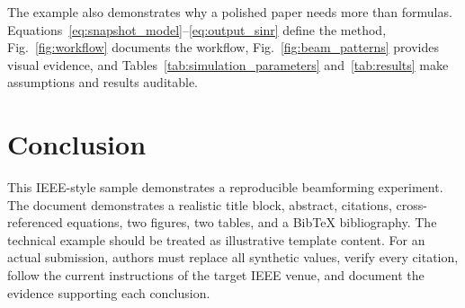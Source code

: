 \documentclass[conference]{IEEEtran}
\begin{document}
The example also demonstrates why a polished paper needs more than formulas. Equations~\eqref{eq:snapshot_model}--\eqref{eq:output_sinr} define the method, Fig.~\ref{fig:workflow} documents the workflow, Fig.~\ref{fig:beam_patterns} provides visual evidence, and Tables~\ref{tab:simulation_parameters} and~\ref{tab:results} make assumptions and results auditable.

\section{Conclusion}
This IEEE-style sample demonstrates a reproducible beamforming experiment. The document demonstrates a realistic title block, abstract, citations, cross-referenced equations, two figures, two tables, and a BibTeX bibliography. The technical example should be treated as illustrative template content. For an actual submission, authors must replace all synthetic values, verify every citation, follow the current instructions of the target IEEE venue, and document the evidence supporting each conclusion.



\end{document}
